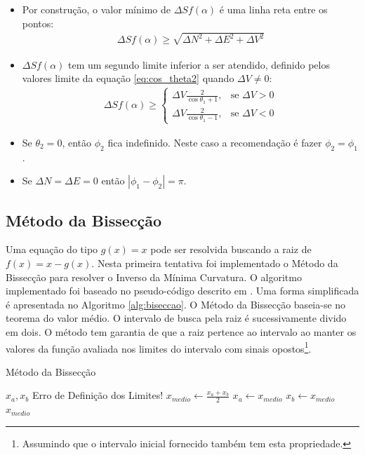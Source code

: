 \documentclass[final,5p]{elsarticle}
\numberwithin{equation}{section}
\begin{document}
\begin{itemize}
    \item Por construção, o valor mínimo de $\Delta S f(\alpha)$ é uma linha reta entre os pontos:
    \begin{align*}
        \Delta S f(\alpha) \geq \sqrt{\Delta N^2 + \Delta E^2 + \Delta V^2}
    \end{align*}
    \item $\Delta S f(\alpha)$ tem um segundo limite inferior a ser atendido, definido pelos valores limite da equação \ref{eq:cos_theta2} quando $\Delta V \neq 0$:
    \begin{align*}
        \Delta S f(\alpha) \geq \begin{cases}
            \Delta V \frac{2}{\cos \theta_1+1},&\text{se } \Delta V > 0 \\
            \Delta V \frac{2}{\cos \theta_1-1},&\text{se } \Delta V < 0  
        \end{cases}
    \end{align*}
    \item Se $\theta_2 = 0$, então $\phi_2$ fica indefinido. Neste caso a recomendação é fazer $\phi_2 = \phi_1$. 
    \item Se $\Delta N = \Delta E = 0$ então $|\phi_1 - \phi_2| = \pi$.
\end{itemize}

    \subsection{Método da Bissecção} \label{sec:bissecao}
    
    Uma equação do tipo $g(x)=x$ pode ser resolvida buscando a raiz de $f(x) = x - g(x)$. Nesta primeira tentativa foi implementado o Método da Bissecção para resolver o Inverso da Mínima Curvatura. O algoritmo implementado foi baseado no pseudo-código descrito em \cite{burden2016analise}. Uma forma simplificada é apresentada no Algoritmo \ref{alg:biseccao}. O Método da Bissecção baseia-se no teorema do valor médio. O intervalo de busca pela raiz é sucessivamente divido em dois. O método tem garantia de que a raiz pertence ao intervalo ao manter os valores da função avaliada nos limites do intervalo com sinais opostos\footnote{Assumindo que o intervalo inicial fornecido também tem esta propriedade.}. 

    \begin{algorithm}
        \caption{Método da Bissecção}\label{alg:biseccao}
        \begin{algorithmic}
            \Require $x_a, x_b$
                \State Erro de Definição dos Limites!
            \EndIf
            \State $x_{medio} \gets \frac{x_a+x_b}{2}$
                    \State $x_a \gets x_{medio}$
                \Else
                    \State $x_b \gets x_{medio}$
                \EndIf
            \EndWhile
            \State \Return $x_{medio}$
        \end{algorithmic}
    \end{algorithm}
    
\end{document}

